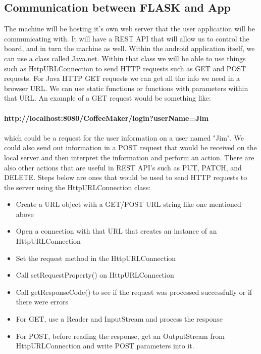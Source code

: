 \documentclass[conference]{IEEEtran}
\begin{document}
\subsection{Communication between FLASK and App}
The machine will be hosting it's own web server that the user application will
be communicating with. It will have a REST API that will allow us to control the
board, and in turn the machine as well. Within the android application itself,
we can use a class called Java.net. Within that class we will be able to use
things such as HttpURLConnection to send HTTP requests such as GET and POST
requests. For Java HTTP GET requests we can get all the info we need in a
browser URL. We can use static functions or functions with parameters within
that URL. An example of a GET request would be something like: \\ \\
\textbf{http://localhost:8080/CoffeeMaker/login?userName=Jim}\\ \\which could
be a request for the user information on a user named "Jim". We could also send
out information in a POST request that would be received on the local server
and then interpret the information and perform an action. There are also other
actions that are useful in REST API's such as PUT, PATCH, and DELETE. Steps
below are ones that would be used to send HTTP requests to the server using the
HttpURLConnection class:
\begin{itemize}
\item Create a URL object with a GET/POST URL string like one mentioned above
\item Open a connection with that URL that creates an instance of an HttpURLConnection
\item Set the request method in the HttpURLConnection
\item Call setRequestProperty() on HttpURLConnection
\item Call getResponseCode() to see if the request was processed successfully or
if there were errors
\item For GET, use a Reader and InputStream and process the response
\item For POST, before reading the response, get an OutputStream from
HttpURLConnection and write POST parameters into it.
\end{itemize} 
\ \\
\end{document}
